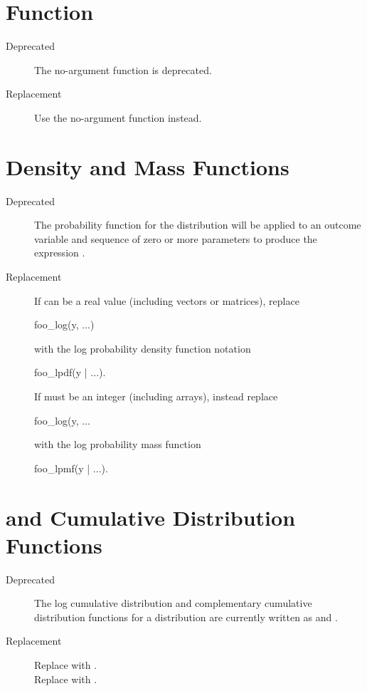 \section{ Function}

\begin{description}
\item[Deprecated]
The no-argument function  is deprecated.
\item[Replacement]
Use the no-argument function  instead.
\end{description}

\section{ Density and Mass Functions}

\begin{description}
\item[Deprecated] The probability function for the distribution
   will be applied to an outcome variable  and
  sequence of zero or more parameters  to produce the
  expression .
\item[Replacement] If  can be a real value (including vectors
or matrices), replace 
%
\begin{stancode}
foo_log(y, ...)
\end{stancode}
%
with the log probability density function notation
%
\begin{stancode}
foo_lpdf(y | ...).
\end{stancode}
%
If  must be an integer (including arrays),
instead replace
%
\begin{stancode}
foo_log(y, ...
\end{stancode}
%
with the log probability mass function
%
\begin{stancode}
foo_lpmf(y | ...).
\end{stancode}
\end{description}

\section{ and  Cumulative Distribution
  Functions} 

\begin{description}
\item[Deprecated] 
The log cumulative distribution and complementary cumulative
distribution functions for a distribution  are currently
written as  and .  
\item[Replacement]
Replace  with .
\\[4pt]
Replace  with .
\end{description}

